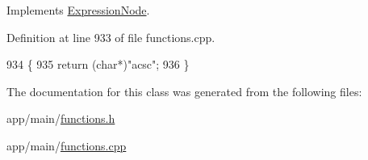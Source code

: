 Implements \hyperlink{classExpressionNode_a42a5e9562b0f645a19dcc83f698069b5}{Expression\+Node}.



Definition at line 933 of file functions.\+cpp.


\begin{DoxyCode}
934 \{
935     \textcolor{keywordflow}{return} (\textcolor{keywordtype}{char}*)\textcolor{stringliteral}{"acsc"};
936 \}
\end{DoxyCode}


The documentation for this class was generated from the following files\+:\begin{DoxyCompactItemize}
\item 
app/main/\hyperlink{functions_8h}{functions.\+h}\item 
app/main/\hyperlink{functions_8cpp}{functions.\+cpp}\end{DoxyCompactItemize}
